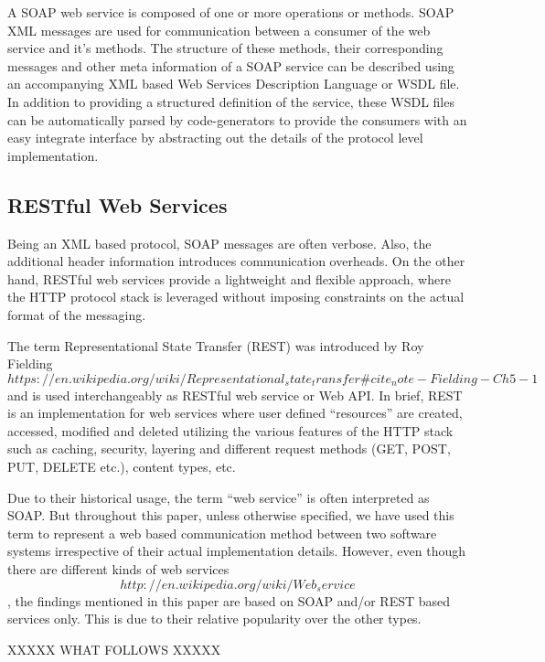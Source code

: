 \documentclass[runningheads,a4paper]{llncs}
\begin{document}
A SOAP web service is composed of one or more operations or methods. SOAP XML messages are used for communication between a consumer of the web service and it’s methods. The structure of these methods, their corresponding messages and other meta information of a SOAP service can be described using an accompanying XML based Web Services Description Language or WSDL file. In addition to providing a structured definition of the service, these WSDL files can be automatically parsed by code-generators to provide the consumers with an easy integrate interface by abstracting out the details of the protocol level implementation.


\subsection{RESTful Web Services} %
\label{sub:restful_web_services}
Being an XML based protocol, SOAP messages are often verbose. Also, the additional header information introduces communication overheads. On the other hand, RESTful web services provide a lightweight and flexible approach, where the HTTP protocol stack is leveraged without imposing constraints on the actual format of the messaging.

The term Representational State Transfer (REST) was introduced by Roy Fielding \[https://en.wikipedia.org/wiki/Representational_state_transfer\#cite_note-Fielding-Ch5-1\] and is used interchangeably as RESTful web service or Web API. In brief, REST is an implementation for web services where user defined ``resources'' are created, accessed, modified and deleted utilizing the various features of the HTTP stack such as caching, security, layering and different request methods (GET, POST, PUT, DELETE etc.), content types, etc.

Due to their historical usage, the term ``web service'' is often interpreted as SOAP. But throughout this paper, unless otherwise specified, we have used this term to represent a web based communication method between two software systems irrespective of their actual implementation details. However, even though there are different kinds of web services \[http://en.wikipedia.org/wiki/Web_service\], the findings mentioned in this paper are based on SOAP and/or REST based services only. This is due to their relative popularity over the other types.


XXXXX WHAT FOLLOWS XXXXX
\end{document}
